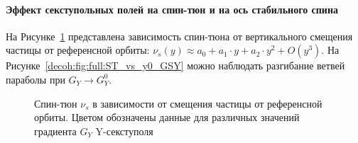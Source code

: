 \paragraph{Эффект секступольных полей на спин-тюн и на ось стабильного спина}\label{par:Sextupole-effect-on-spin-tune-and-nbar}
На Рисунке~\ref{decoh:fig:ST_vs_y0_GSY} представлена зависимость спин-тюна от вертикального смещения частицы от референсной орбиты: ${\nu_s(y) \approx a_0 + a_1\cdot y + a_2\cdot y^2 + O(y^3)}$. 
На Рисунке~\ref{decoh:fig:full:ST_vs_y0_GSY} можно наблюдать разгибание ветвей параболы 
при ${G_Y \rightarrow G_Y^0}$.

\begin{figure}[H]
	\centering
	\end{figure}
	\begin{figure}[H]\centering
	\caption{Спин-тюн $\nu_s$ в зависимости от смещения частицы от референсной орбиты.\label{decoh:fig:ST_vs_y0_GSY}
		Цветом обозначены данные для различных значений градиента $G_Y$ Y-секступоля}
\end{figure}

